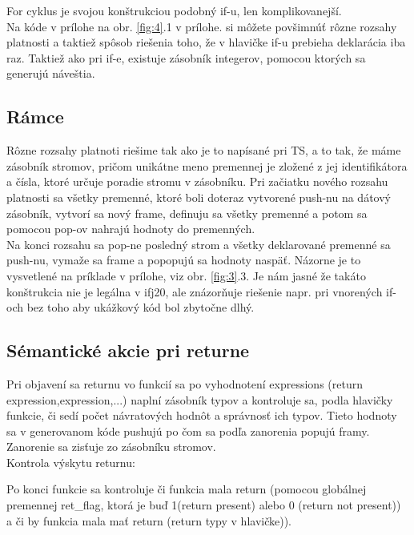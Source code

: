 \documentclass[a4paper,11pt]{article}
\begin{document}
		For cyklus je svojou konštrukciou podobný if-u, len komplikovanejší.\\

		\noindent Na kóde v prílohe na obr. \ref{fig:4}.1 v prílohe. si môžete povšimnúť rôzne rozsahy platnosti a taktiež spôsob riešenia toho, že v hlavičke if-u prebieha deklarácia iba raz. Taktiež ako pri if-e, existuje zásobník integerov, pomocou ktorých sa generujú náveštia.

		\subsection{Rámce}\label{subsec:ramce}

		\noindent Rôzne rozsahy platnoti riešime tak ako je to napísané pri TS, a to tak, že máme zásobník stromov, pričom unikátne meno premennej je zložené z jej identifikátora a čísla, ktoré určuje poradie stromu v zásobníku. Pri začiatku nového rozsahu platnosti sa všetky premenné, ktoré boli doteraz vytvorené push-nu na dátový zásobník, vytvorí sa nový frame, definuju sa všetky premenné a potom sa pomocou pop-ov nahrajú hodnoty do premenných.\\ Na konci rozsahu sa pop-ne posledný strom a všetky deklarované premenné sa push-nu, vymaže sa frame a popopujú sa hodnoty naspäť. Názorne je to vysvetlené na príklade v prílohe, viz obr. \ref{fig:3}.3. Je nám jasné že takáto konštrukcia nie je legálna v ifj20, ale znázorňuje riešenie napr. pri vnorených if-och bez toho aby ukážkový kód bol zbytočne dlhý.

		\subsection{Sémantické akcie pri returne}\label{subsec:return}

			\noindent Pri objavení sa returnu vo funkcií sa po vyhodnotení expressions (return expression,expression,...) naplní zásobník typov a kontroluje sa, podla hlavičky funkcie, či sedí počet návratových hodnôt a správnosť ich typov. Tieto hodnoty sa v generovanom kóde pushujú po čom sa podľa zanorenia popujú framy.
			\noindent Zanorenie sa zisťuje zo zásobníku stromov.\\

			\noindent Kontrola výskytu returnu:

			\noindent Po konci funkcie sa kontroluje či funkcia mala return (pomocou globálnej premennej ret\_flag, ktorá je buď 1(return present) alebo 0 (return not present)) a či by funkcia mala mať return (return typy v hlavičke)).\\
\end{document}
